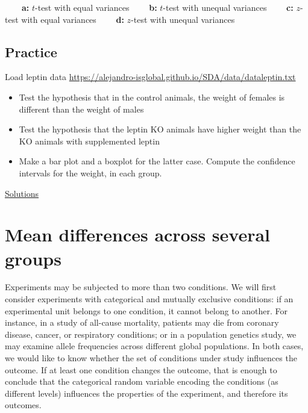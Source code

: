 \documentclass[
]{book}
\begin{document}
\textbf{\(\qquad\)a:} \(t\)-test with equal variances
\textbf{\(\qquad\)b:} \(t\)-test with unequal variances
\textbf{\(\qquad\)c:} \(z\)-test with equal variances
\textbf{\(\qquad\)d:} \(z\)-test with unequal variances

\hypertarget{practice-6}{%
\section{Practice}\label{practice-6}}

Load leptin data \url{https://alejandro-isglobal.github.io/SDA/data/dataleptin.txt}

\begin{itemize}
\item
  Test the hypothesis that in the control animals, the weight of females is different than the weight of males
\item
  Test the hypothesis that the leptin KO animals have higher weight than the KO animals with supplemented leptin
\item
  Make a bar plot and a boxplot for the latter case. Compute the confidence intervals for the weight, in each group.
\end{itemize}

\href{https://colab.research.google.com/drive/1F61puLHyUBuS5ERbbruy4002bQ3C3DjY?usp=sharing}{Solutions}

\hypertarget{mean-differences-across-several-groups}{%
\chapter{Mean differences across several groups}\label{mean-differences-across-several-groups}}

Experiments may be subjected to more than two conditions. We will first consider experiments with categorical and mutually exclusive conditions: if an experimental unit belongs to one condition, it cannot belong to another. For instance, in a study of all-cause mortality, patients may die from coronary disease, cancer, or respiratory conditions; or in a population genetics study, we may examine allele frequencies across different global populations. In both cases, we would like to know whether the set of conditions under study influences the outcome. If at least one condition changes the outcome, that is enough to conclude that the categorical random variable encoding the conditions (as different levels) influences the properties of the experiment, and therefore its outcomes.
\end{document}
